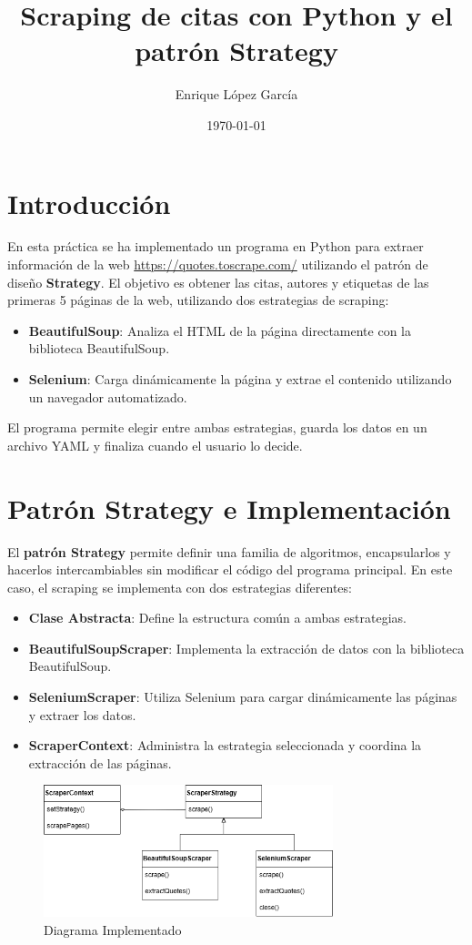 \documentclass[a4paper,12pt]{article}
\title{Scraping de citas con Python y el patrón Strategy}
\author{Enrique López García}
\date{\today}
\begin{document}
\maketitle

\section{Introducción}
En esta práctica se ha implementado un programa en Python para extraer información de la web \url{https://quotes.toscrape.com/} utilizando el patrón de diseño \textbf{Strategy}. 
El objetivo es obtener las citas, autores y etiquetas de las primeras 5 páginas de la web, utilizando dos estrategias de scraping: 
\begin{itemize}
    \item \textbf{BeautifulSoup}: Analiza el HTML de la página directamente con la biblioteca BeautifulSoup.
    \item \textbf{Selenium}: Carga dinámicamente la página y extrae el contenido utilizando un navegador automatizado.
\end{itemize}

El programa permite elegir entre ambas estrategias, guarda los datos en un archivo YAML y finaliza cuando el usuario lo decide.

\section{Patrón Strategy e Implementación}
El \textbf{patrón Strategy} permite definir una familia de algoritmos, encapsularlos y hacerlos intercambiables sin modificar el código del programa principal. En este caso, el scraping se implementa con dos estrategias diferentes:

\begin{itemize}
    \item \textbf{Clase Abstracta}: Define la estructura común a ambas estrategias.
    \item \textbf{BeautifulSoupScraper}: Implementa la extracción de datos con la biblioteca BeautifulSoup.
    \item \textbf{SeleniumScraper}: Utiliza Selenium para cargar dinámicamente las páginas y extraer los datos.
    \item \textbf{ScraperContext}: Administra la estrategia seleccionada y coordina la extracción de las páginas.
\end{itemize}

\begin{figure}
    \centering
    \includegraphics[width=0.75\textwidth]{images/DiagramaP1Ej3.png}
    \caption{Diagrama Implementado}
    \label{fig:diagrama_ej3}
\end{figure}
\end{document}
